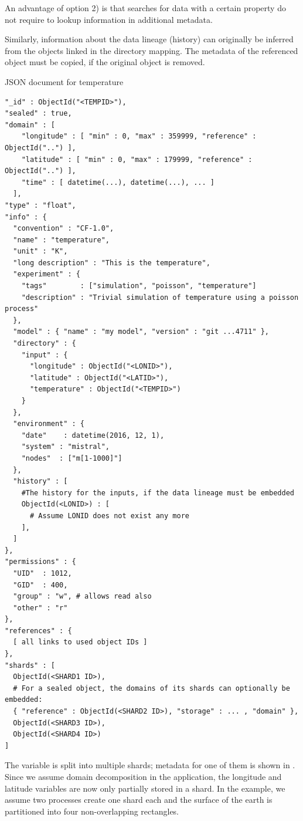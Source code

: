 \documentclass{../../template/esiwace-report}
\begin{document}
An advantage of option 2) is that searches for data with a certain property do not require to lookup information in additional metadata.

Similarly, information about the data lineage (history) can originally be inferred from the objects linked in the directory mapping.
The metadata of the referenced object must be copied, if the original object is removed.

\begin{tcbcode}[label={lst:mongotemperature}]{JSON document for temperature}
\begin{lstlisting}
"_id" : ObjectId("<TEMPID>"),
"sealed" : true,
"domain" : [
    "longitude" : [ "min" : 0, "max" : 359999, "reference" : ObjectId("..") ],
    "latitude" : [ "min" : 0, "max" : 179999, "reference" : ObjectId("..") ],
    "time" : [ datetime(...), datetime(...), ... ]
  ],
"type" : "float",
"info" : {
  "convention" : "CF-1.0",
  "name" : "temperature",
  "unit" : "K",
  "long description" : "This is the temperature",
  "experiment" : { 
    "tags"        : ["simulation", "poisson", "temperature"]
    "description" : "Trivial simulation of temperature using a poisson process"
  },
  "model" : { "name" : "my model", "version" : "git ...4711" },
  "directory" : {
	"input" : {
	  "longitude" : ObjectId("<LONID>"),
	  "latitude" : ObjectId("<LATID>"), 
	  "temperature" : ObjectId("<TEMPID>")
	}  
  },
  "environment" : {
    "date"    : datetime(2016, 12, 1),
    "system" : "mistral",
    "nodes"  : ["m[1-1000]"]
  },
  "history" : [
    #The history for the inputs, if the data lineage must be embedded
    ObjectId(<LONID>) : [
      # Assume LONID does not exist any more
    ],
  ]
},
"permissions" : {
  "UID"  : 1012,
  "GID"  : 400,
  "group" : "w", # allows read also
  "other" : "r"
},
"references" : {
  [ all links to used object IDs ]
},
"shards" : [
  ObjectId(<SHARD1 ID>), 
  # For a sealed object, the domains of its shards can optionally be embedded:
  { "reference" : ObjectId(<SHARD2 ID>), "storage" : ... , "domain" },   
  ObjectId(<SHARD3 ID>),
  ObjectId(<SHARD4 ID>)
]
\end{lstlisting}
\end{tcbcode}

The variable is split into multiple shards; metadata for one of them is shown in .
Since we assume domain decomposition in the application, the longitude and latitude variables are now only partially stored in a shard.
In the example, we assume two processes create one shard each and the surface of the earth is partitioned into four non-overlapping rectangles.
\end{document}
